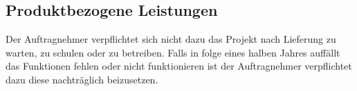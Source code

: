 \subsection{Produktbezogene Leistungen}
Der Auftragnehmer verpflichtet sich nicht dazu das Projekt nach Lieferung zu warten, zu schulen oder zu betreiben. Falls in folge eines halben Jahres auffällt das Funktionen fehlen oder nicht funktionieren ist der Auftragnehmer verpflichtet dazu diese nachträglich beizusetzen.